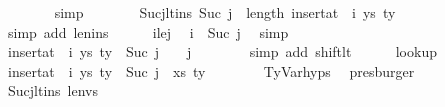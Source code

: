 \begin{isabellebody}
\ \ \ \ \ \ \isamarkupfalse%
\ simp\isanewline
\ \ \ \ \isamarkupfalse%
\ \isamarkupfalse%
\ Sucj{\isacharunderscore}{\kern0pt}lt{\isacharunderscore}{\kern0pt}ins{\isacharcolon}{\kern0pt}\ {\isachardoublequoteopen}Suc\ j\ {\isacharless}{\kern0pt}\ length\ {\isacharparenleft}{\kern0pt}insert{\isacharunderscore}{\kern0pt}at\ {\isasymGamma}\ i\ {\isacharparenleft}{\kern0pt}ys{\isacharcomma}{\kern0pt}\ ty{}{\isacharparenright}{\kern0pt}{\isacharparenright}{\kern0pt}{\isachardoublequoteclose}\isanewline
\ \ \ \ \ \ \isamarkupfalse%
\ {\isacharparenleft}{\kern0pt}simp\ add{\isacharcolon}{\kern0pt}\ len{\isacharunderscore}{\kern0pt}ins{\isacharparenright}{\kern0pt}\isanewline
\isanewline
\ \ \ \ \isamarkupfalse%
\ i{\isacharunderscore}{\kern0pt}le{\isacharunderscore}{\kern0pt}j\ \isamarkupfalse%
\ {\isachardoublequoteopen}i\ {\isacharless}{\kern0pt}\ Suc\ j{\isachardoublequoteclose}\ \isamarkupfalse%
\ simp\isanewline
\ \ \ \ \isamarkupfalse%
\ \isamarkupfalse%
\ {\isachardoublequoteopen}{\isacharparenleft}{\kern0pt}insert{\isacharunderscore}{\kern0pt}at\ {\isasymGamma}\ i\ {\isacharparenleft}{\kern0pt}ys{\isacharcomma}{\kern0pt}\ ty{}{\isacharparenright}{\kern0pt}{\isacharparenright}{\kern0pt}\ {\isacharbang}{\kern0pt}\ Suc\ j\ {\isacharequal}{\kern0pt}\ {\isasymGamma}\ {\isacharbang}{\kern0pt}\ j{\isachardoublequoteclose}\isanewline
\ \ \ \ \ \ \isamarkupfalse%
\ {\isacharparenleft}{\kern0pt}simp\ add{\isacharcolon}{\kern0pt}\ shift{\isacharunderscore}{\kern0pt}lt{\isacharparenright}{\kern0pt}\isanewline
\isanewline
\ \ \ \ \isamarkupfalse%
\ lookup\ \isamarkupfalse%
\ {\isachardoublequoteopen}{\isacharparenleft}{\kern0pt}insert{\isacharunderscore}{\kern0pt}at\ {\isasymGamma}\ i\ {\isacharparenleft}{\kern0pt}ys{\isacharcomma}{\kern0pt}\ ty{}{\isacharparenright}{\kern0pt}{\isacharparenright}{\kern0pt}\ {\isacharbang}{\kern0pt}\ Suc\ j\ {\isacharequal}{\kern0pt}\ {\isacharparenleft}{\kern0pt}xs{\isacharcomma}{\kern0pt}\ ty{\isacharparenright}{\kern0pt}{\isachardoublequoteclose}\isanewline
\ \ \ \ \ \ \isamarkupfalse%
\ TyVar{\isachardot}{\kern0pt}hyps{\isacharparenleft}{\kern0pt}{}{\isacharparenright}{\kern0pt}\ \isamarkupfalse%
\ presburger\isanewline
\isanewline
\ \ \ \ \isamarkupfalse%
\ Sucj{\isacharunderscore}{\kern0pt}lt{\isacharunderscore}{\kern0pt}ins\ len{\isacharunderscore}{\kern0pt}vs\isanewline

\end{isabellebody}
